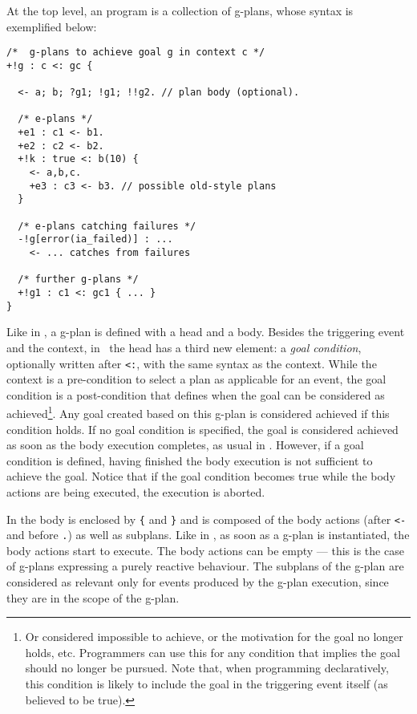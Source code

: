 At the top level, an {\aser} program is a collection of g-plans, whose
syntax is exemplified below:
%
%
{\small
\begin{verbatim}
/*  g-plans to achieve goal g in context c */
+!g : c <: gc { 

  <- a; b; ?g1; !g1; !!g2. // plan body (optional).

  /* e-plans */
  +e1 : c1 <- b1.	
  +e2 : c2 <- b2.
  +!k : true <: b(10) {
    <- a,b,c.
    +e3 : c3 <- b3. // possible old-style plans
  }	
  
  /* e-plans catching failures */
  -!g[error(ia_failed)] : ...
    <- ... catches from failures 

  /* further g-plans */
  +!g1 : c1 <: gc1 { ... }
}
\end{verbatim}}

Like in {\asl}, a g-plan is defined with a head and a body.
%
Besides the triggering event and the context, in \aser\ the head has a
third new element: a \emph{goal condition}, optionally written after
\texttt{<:}, with the same syntax as the context. While the context is
a pre-condition to select a plan as applicable for an event, the goal
condition is a post-condition that defines when the goal can be
considered as achieved\footnote{Or considered impossible to achieve,
  or the motivation for the goal no longer holds, etc. Programmers can
  use this for any condition that implies the goal should no longer be
  pursued. Note that, when programming declaratively, this condition
  is likely to include the goal in the triggering event itself (as
  believed to be true).}. Any goal created based on this g-plan is
considered achieved if %
this condition holds. If no goal condition is specified, the goal is
considered achieved as soon as the body execution completes, as usual
in \asl. However, if a goal condition is defined, having finished the
body execution is not sufficient to achieve the goal. Notice that if
the goal condition becomes true while the body actions are being
executed, the execution is aborted.

In {\aser} the body is enclosed by \texttt{\{} and \texttt{\}} and is
composed of the body actions (after \texttt{<-} and before \texttt{.})
as well as subplans. 
%
Like in {\asl}, as soon as a g-plan is instantiated, the body actions
start to execute. The body actions can be empty --- this is the case
of g-plans expressing a purely reactive behaviour.
%
The subplans of the g-plan are considered as relevant only for events
produced by the g-plan execution, since they are in the scope of the
g-plan.

